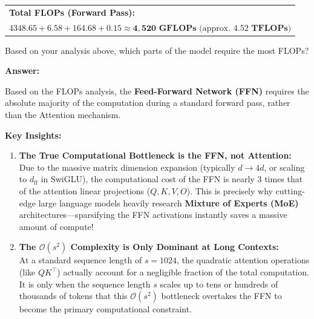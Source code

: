 \begin{answerbox}
    \begin{tabular}{@{}l@{}}
        \textbf{Total FLOPs (Forward Pass):} \\
        $4348.65 + 6.58 + 164.68 + 0.15 \approx \mathbf{4,520 \text{ GFLOPs}} \text{ (approx. } \mathbf{4.52 \text{ TFLOPs}}\text{)}$
    \end{tabular}

    \vspace{0.5em}
    \rule{0pt}{1.5em}
\end{answerbox}



\begin{questionbox}
    Based on your analysis above, which parts of the model require the most FLOPs?
\end{questionbox}

\begin{answerbox}
    \textbf{Answer:}

    Based on the FLOPs analysis, the \textbf{Feed-Forward Network (FFN)} requires the absolute majority of the computation during a standard forward pass, rather than the Attention mechanism.

    \vspace{0.5em}
    \textbf{Key Insights:}
    \begin{enumerate}[itemsep=1em, parsep=0pt, topsep=0.5em]
        \item \textbf{The True Computational Bottleneck is the FFN, not Attention:}\\
              Due to the massive matrix dimension expansion (typically $d \rightarrow 4d$, or scaling to $d_{\mathrm{ff}}$ in SwiGLU), the computational cost of the FFN is nearly 3 times that of the attention linear projections ($Q, K, V, O$). This is precisely why cutting-edge large language models heavily research \textbf{Mixture of Experts (MoE)} architectures—sparsifying the FFN activations instantly saves a massive amount of compute!

        \item \textbf{The $\mathcal{O}(s^2)$ Complexity is Only Dominant at Long Contexts:}\\
              At a standard sequence length of $s=1024$, the quadratic attention operations (like $QK^\top$) actually account for a negligible fraction of the total computation. It is only when the sequence length $s$ scales up to tens or hundreds of thousands of tokens that this $\mathcal{O}(s^2)$ bottleneck overtakes the FFN to become the primary computational constraint.
    \end{enumerate}

    \vspace{0.5em}
    \rule{0pt}{1.5em}
\end{answerbox}



